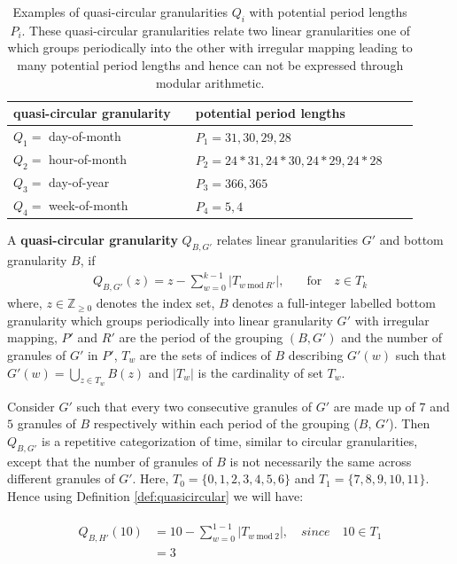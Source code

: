 \documentclass[12pt]{article}
\begin{document}
\begin{table}[ht]
\begin{center}
\begin{tabular}{lr@{~}lr@{~}r}
\hline
quasi-circular granularity && potential period lengths\\
\hline
$Q_1 =$ day-of-month && $P_1 = 31, 30, 29, 28$\\
$Q_2 =$ hour-of-month && $P_2 = 24*31, 24*30, 24*29, 24*28$\\
$Q_3 =$ day-of-year && $P_3 = 366, 365$\\
$Q_4 =$ week-of-month && $P_4 = 5, 4$\\
\bottomrule
\end{tabular}
\end{center}
\caption{Examples of quasi-circular granularities $Q_i$ with potential period lengths $P_i$. These quasi-circular granularities relate two linear granularities one of which groups periodically into the other with irregular mapping leading to many potential period lengths and hence can not be expressed through modular arithmetic. }
\label{tab:quasi}
\end{table}

\begin{definition}\label{def:quasicircular}
A {\bf quasi-circular granularity} $Q_{B, G'}$ relates linear granularities $G'$ and bottom granularity $B$, if
\begin{equation}\label{eq:quasi}
\begin{split}
Q_{B, G'}(z) =
z - \sum_{w=0}^{k-1}\vert T_{w ~\text{mod}~R'} \vert, & \quad \text{for}\quad z \in T_{k}
\end{split}
\end{equation}
where,
$z \in \mathbb{Z}_{\geq 0}$ denotes the index set,
$B$ denotes a full-integer labelled bottom granularity which groups periodically into linear granularity $G'$ with irregular mapping, $P'$ and $R'$ are the period of the grouping $(B, G')$ and the number of granules of $G'$ in $P'$, $T_w$ are the sets of indices of $B$ describing $G'(w)$ such that  $G'(w) = \bigcup_{z \in T_w}B(z)$ and $\vert T_w \vert$ is the cardinality of set $T_w$.
\end{definition}

\begin{example}
{\rm Consider $G'$ such that every two consecutive granules of $G'$ are made up of $7$ and $5$ granules of $B$ respectively within each period of the grouping ($B$, $G'$). Then $Q_{B, G'}$ is a repetitive categorization of time, similar to circular granularities, except that the number of granules of $B$ is not necessarily the same across different granules of $G'$. Here, $T_0 = \{0, 1, 2, 3, 4, 5, 6\}$ and $T_1 = \{7, 8, 9, 10, 11\}$. Hence using Definition \autoref{def:quasicircular} we will have:

\begin{align*}
\begin{split}
Q_{B,H'}(10) & = 10 - \sum_{w=0}^{1-1}\vert T_{w ~\text{mod}~2}\vert ,\quad since \quad 10 \in T_{1}  \\
  & = 3 \\
\end{split}
\end{align*}
}
\end{example}
\end{document}
